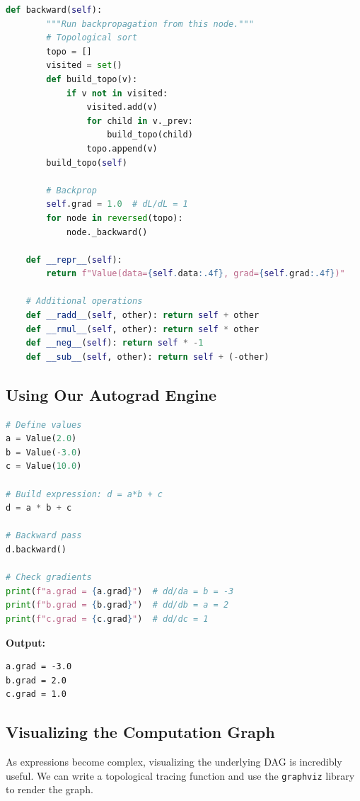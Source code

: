 \begin{lstlisting}[language=Python, caption={Simple Autograd Engine: Value Class}]
    def backward(self):
        """Run backpropagation from this node."""
        # Topological sort
        topo = []
        visited = set()
        def build_topo(v):
            if v not in visited:
                visited.add(v)
                for child in v._prev:
                    build_topo(child)
                topo.append(v)
        build_topo(self)
        
        # Backprop
        self.grad = 1.0  # dL/dL = 1
        for node in reversed(topo):
            node._backward()
    
    def __repr__(self):
        return f"Value(data={self.data:.4f}, grad={self.grad:.4f})"
    
    # Additional operations
    def __radd__(self, other): return self + other
    def __rmul__(self, other): return self * other
    def __neg__(self): return self * -1
    def __sub__(self, other): return self + (-other)
\end{lstlisting}

\subsection{Using Our Autograd Engine}

\begin{lstlisting}[language=Python, caption={Example: Computing Gradients}]
# Define values
a = Value(2.0)
b = Value(-3.0)
c = Value(10.0)

# Build expression: d = a*b + c
d = a * b + c

# Backward pass
d.backward()

# Check gradients
print(f"a.grad = {a.grad}")  # dd/da = b = -3
print(f"b.grad = {b.grad}")  # dd/db = a = 2
print(f"c.grad = {c.grad}")  # dd/dc = 1
\end{lstlisting}

\textbf{Output:}
\begin{verbatim}
a.grad = -3.0
b.grad = 2.0
c.grad = 1.0
\end{verbatim}

\subsection{Visualizing the Computation Graph}

As expressions become complex, visualizing the underlying DAG is incredibly useful. We can write a topological tracing function and use the \texttt{graphviz} library to render the graph.

